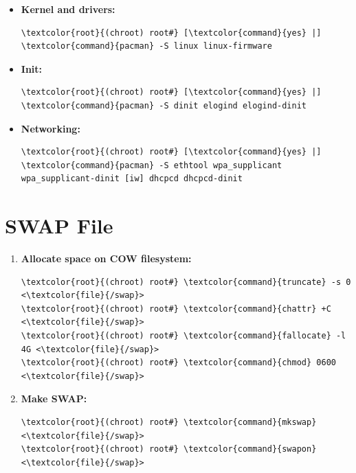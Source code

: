\documentclass[10pt, a4paper, onecolumn, oneside, titlepage, openany]{book}
\begin{document}
\begin{itemize}
\begin{Verbatim}[commandchars=\\\{\}]
\textcolor{root}{(chroot) root#} [\textcolor{command}{yes} |] \textcolor{command}{pacman} -S intel-ucode
\end{Verbatim}
    \item \textbf{Kernel and drivers:}
\begin{Verbatim}[commandchars=\\\{\}]
\textcolor{root}{(chroot) root#} [\textcolor{command}{yes} |] \textcolor{command}{pacman} -S linux linux-firmware
\end{Verbatim}
    \item \textbf{Init:}
\begin{Verbatim}[commandchars=\\\{\}]
\textcolor{root}{(chroot) root#} [\textcolor{command}{yes} |] \textcolor{command}{pacman} -S dinit elogind elogind-dinit
\end{Verbatim}
    \item \textbf{Networking:}
\begin{Verbatim}[commandchars=\\\{\}]
\textcolor{root}{(chroot) root#} [\textcolor{command}{yes} |] \textcolor{command}{pacman} -S ethtool wpa_supplicant
wpa_supplicant-dinit [iw] dhcpcd dhcpcd-dinit
\end{Verbatim}
\end{itemize}

\section{SWAP File}
\begin{enumerate}
    \item \textbf{Allocate space on COW filesystem:}
\begin{Verbatim}[commandchars=\\\{\}]
\textcolor{root}{(chroot) root#} \textcolor{command}{truncate} -s 0 <\textcolor{file}{/swap}>
\textcolor{root}{(chroot) root#} \textcolor{command}{chattr} +C <\textcolor{file}{/swap}>
\textcolor{root}{(chroot) root#} \textcolor{command}{fallocate} -l 4G <\textcolor{file}{/swap}>
\textcolor{root}{(chroot) root#} \textcolor{command}{chmod} 0600 <\textcolor{file}{/swap}>
\end{Verbatim}
    \item \textbf{Make SWAP:}
\begin{Verbatim}[commandchars=\\\{\}]
\textcolor{root}{(chroot) root#} \textcolor{command}{mkswap} <\textcolor{file}{/swap}>
\textcolor{root}{(chroot) root#} \textcolor{command}{swapon} <\textcolor{file}{/swap}>
\end{Verbatim}
\end{enumerate}
\end{document}
